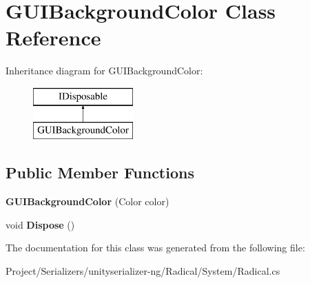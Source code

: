 \hypertarget{class_g_u_i_background_color}{}\section{G\+U\+I\+Background\+Color Class Reference}
\label{class_g_u_i_background_color}
Inheritance diagram for G\+U\+I\+Background\+Color\+:\begin{figure}[H]
\begin{center}
\leavevmode
\includegraphics[height=2.000000cm]{class_g_u_i_background_color}
\end{center}
\end{figure}
\subsection*{Public Member Functions}
\begin{DoxyCompactItemize}
\item 
\mbox{\label{class_g_u_i_background_color_a0bbdf8b7ba29e00fe4587cef08e2dca0}} 
{\bfseries G\+U\+I\+Background\+Color} (Color color)
\item 
\mbox{\label{class_g_u_i_background_color_a7e11cea7ee2fafcd47a45982bb3cd1ab}} 
void {\bfseries Dispose} ()
\end{DoxyCompactItemize}


The documentation for this class was generated from the following file\+:\begin{DoxyCompactItemize}
\item 
Project/\+Serializers/unityserializer-\/ng/\+Radical/\+System/Radical.\+cs\end{DoxyCompactItemize}
